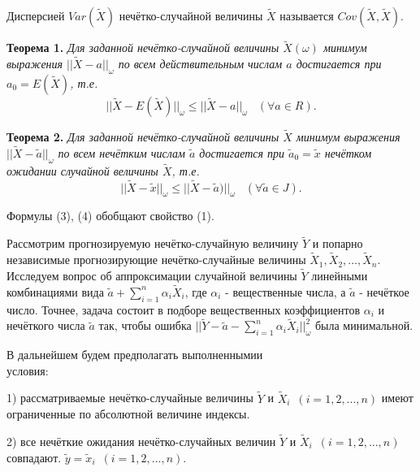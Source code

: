 Дисперсией $Var(\tilde{X})$ нечётко-случайной величины $\tilde{X}$ называется $Cov(\tilde{X}, \tilde{X})$.



\textbf{Теорема 1.} \textit{Для заданной нечётко-случайной величины $\tilde{X}(\omega)$ минимум выражения $||\tilde{X} - a||_{\omega} $ по всем действительным числам $a$ достигается при $a_0 = E(\tilde{X})$, т.е.}
\begin{equation}
||\tilde{X}-E(\tilde{X})||_{\omega}\leq ||\tilde{X}-a||_{\omega}\,\,\,\,\,(\forall a\in R).
\end{equation}

\textbf{Теорема 2. }\textit{Для заданной нечётко-случайной величины $\tilde{X}$ минимум выражения $||\tilde{X} - \tilde{a}||_{\omega}$ по всем нечётким числам $\tilde{a}$ достигается при $\tilde{a}_0 = \tilde{x}$ нечётком ожидании случайной величины $\tilde{X}$, т.е.}
\begin{equation}
||\tilde{X}-\tilde{x}||_{\omega}\leq ||\tilde{X}-\tilde{a})||_{\omega}\,\,\,\,\,(\forall \tilde{a}\in J).
\end{equation}

Формулы (3), (4) обобщают свойство (1).

Рассмотрим прогнозируемую нечётко-случайную величину $\tilde{Y}$ и попарно независимые прогнозирующие нечётко-случайные величины $\tilde{X}_1, \tilde{X}_2,..., \tilde{X}_n$. Исследуем вопрос об аппроксимации случайной величины $\tilde{Y}$ линейными комбинациями вида $\tilde{a} + \sum\limits_{i=1}^n\alpha_i\tilde{X}_i$, где $\alpha_i$ - вещественные числа, а $ \tilde{a}$ - нечёткое число. Точнее, задача состоит в подборе вещественных коэффициентов $\alpha_i$ и нечёткого числа $\tilde{a}$ так, чтобы ошибка $||\tilde{Y} - \tilde{a}- \sum\limits_{i=1}^n\alpha_i\tilde{X}_i||_{\omega}^2$ была минимальной.

В дальнейшем будем предполагать выполненнымии
\\условия:

1) рассматриваемые нечётко-случайные величины $\tilde{Y}$ и $\tilde{X}_i$\,\,\,$(i = 1, 2,...,n)$ имеют ограниченные по абсолютной величине индексы.

2) все нечёткие ожидания нечётко-случайных величин $\tilde{Y}$ и $\tilde{X}_i$\,\,\,$(i = 1, 2,...,n)$ совпадают. $\tilde{y} = \tilde{x}_i$\,\,\,$(i = 1, 2,..., n)$.

